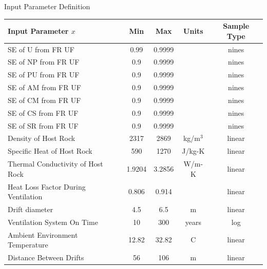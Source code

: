 \documentclass[pdf, autumn, slideColor, nocolorBG]{prosper}
\newcommand{\superscript}[1]{\ensuremath{^{\textrm{#1}}}}
\begin{document}
\begin{slide}{Input Parameter Definition}
\tiny
\begin{center}
\begin{tabular}{|l||c|c|c|c|}
\hline
\textbf{Input Parameter $x$} & \textbf{Min} & \textbf{Max} & \textbf{Units} & \textbf{Sample Type}\\
\hline
SE of U from FR UF & 0.99 & 0.9999 & & nines \\
\hline
SE of NP from FR UF & 0.9 & 0.9999 & & nines \\
\hline
SE of PU from FR UF & 0.9 & 0.9999 & & nines \\
\hline
SE of AM from FR UF & 0.9 & 0.9999 & & nines \\
\hline
SE of CM from FR UF & 0.9 & 0.9999 & & nines \\
\hline
SE of CS from FR UF & 0.9 & 0.9999 & & nines \\
\hline
SE of SR from FR UF & 0.9 & 0.9999 & & nines \\
\hline
Density of Host Rock & 2317 & 2869 & kg/m\superscript{3} & linear \\
\hline
Specific Heat of Host Rock & 590 & 1270 & J/kg-K & linear \\
\hline
Thermal Conductivity of Host Rock & 1.9204 & 3.2856 & W/m-K & linear \\
\hline
Heat Loss Factor During Ventilation  & 0.806 & 0.914 & & linear \\
\hline
Drift diameter & 4.5 & 6.5 & m & linear \\
\hline
Ventilation System On Time & 10 & 300 & years & log \\
\hline
Ambient Environment Temperature & 12.82 & 32.82 & C & linear \\
\hline
Distance Between Drifts & 56 & 106 & m & linear \\
\hline
\end{tabular}
\end{center}
\end{slide}
\end{document}
